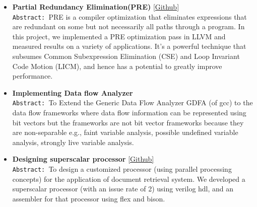 \documentclass[9pt]{article}
\newenvironment{changemargin}[2]{%
  \begin{list}{}{%
    \setlength{\topsep}{0pt}%
    \setlength{\leftmargin}{#1}%
    \setlength{\rightmargin}{#2}%
    \setlength{\listparindent}{\parindent}%
    \setlength{\itemindent}{\parindent}%
    \setlength{\parsep}{\parskip}%
  }%
  \item[]}{\end{list}
}
\newenvironment{body} {
	\vspace*{-16pt}
	\begin{changemargin}{-0.25in}{-0.5in}
  }	
	{\end{changemargin}
}
\begin{document}
\begin{body}
\begin{itemize}
           \item \textbf{Partial Redundancy Elimination(PRE)} \href{https://github.com/sdasgup3/PartialRedundancyElimination}{[Github]} \\
                                  \texttt{Abstract: }PRE is a compiler optimization that
                                  eliminates expressions that are redundant on
                                  some but not necessarily all paths through a
                                  program. In this project, we implemented a PRE
                                  optimization pass in LLVM and measured results
                                  on a variety of applications. It's a powerful
                                  technique that subsumes Common Subexpression
                                  Elimination (CSE) and Loop Invariant Code
                                  Motion (LICM), and hence has a potential to
                                  greatly improve performance.  

            \item \textbf{Implementing Data flow Analyzer} \\
                                \texttt{Abstract: }To Extend the Generic Data Flow Analyzer
                                GDFA (of gcc) to the data flow frameworks where
                                data flow information can be represented using
                                bit vectors but the frameworks are not bit
                                vector frameworks because they are
                                non-separable e.g., faint variable analysis,
                                possible undefined variable analysis, strongly
                                live variable analysis.	

           \item \textbf{Designing superscalar processor} \href{https://github.com/sdasgup3/Parallel-Processor-Design}{[Github]} \\
                                \texttt{Abstract: }To design a customized processor (using
                                    parallel processing concepts) for the
                                application of document retrieval system. We
                                developed a superscalar processor (with  an
                                    issue rate of 2) using verilog hdl, and an
                                assembler for that processor using flex and
                                bison.  


\end{itemize}
\end{body}
\end{document}
